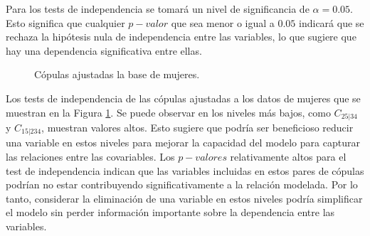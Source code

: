 Para los tests de independencia se tomará un nivel de significancia de $\alpha = 0.05$. Esto significa que cualquier $p-valor$ que sea menor o igual a $0.05$ indicará que se rechaza la hipótesis nula de independencia entre las variables, lo que sugiere que hay una dependencia significativa entre ellas.

\begin{figure}[H]
 \centering
    \caption{Cópulas ajustadas la base de mujeres.}
    \label{fig:copulasTestMu}
\end{figure}
\vspace{-0.3cm}

Los tests de independencia de las cópulas ajustadas a los datos de mujeres que se muestran en la Figura \ref{fig:copulasTestMu}. Se puede observar en los niveles más bajos, como $C_{25|34}$ y $C_{15|234}$, muestran valores altos. Esto sugiere que podría ser beneficioso reducir una variable en estos niveles para mejorar la capacidad del modelo para capturar las relaciones entre las covariables. Los $p-valores$ relativamente altos para el test de independencia indican que las variables incluidas en estos pares de cópulas podrían no estar contribuyendo significativamente a la relación modelada. Por lo tanto, considerar la eliminación de una variable en estos niveles podría simplificar el modelo sin perder información importante sobre la dependencia entre las variables.

